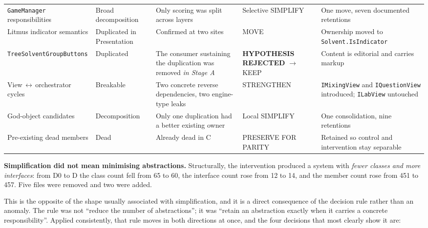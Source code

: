 \documentclass{sbc2019}%
\begin{document}
\begin{table}[!tp]
\begin{tabular}{p{}p{}p{}p{}p{}}
\addlinespace
\texttt{GameManager} responsibilities & Broad decomposition & Only scoring was split across layers & Selective SIMPLIFY & One move, seven documented retentions \\
\addlinespace
Litmus indicator semantics & Duplicated in Presentation & Confirmed at two sites & MOVE & Ownership moved to \texttt{Solvent.\allowbreak{}IsIndicator} \\
\addlinespace
\texttt{TreeSolvent\allowbreak{}GroupButtons} & Duplicated & The consumer sustaining the duplication was removed \emph{in Stage A} & \textbf{HYPOTHESIS REJECTED} $\rightarrow$ KEEP & Content is editorial and carries markup \\
\addlinespace
View\,$\leftrightarrow$\,orchestrator cycles & Breakable & Two concrete reverse dependencies, two engine-type leaks & STRENGTHEN & \texttt{IMixingView} and \texttt{IQuestionView} introduced; \texttt{ILabView} untouched \\
\addlinespace
God-object candidates & Decomposition & Only one duplication had a better existing owner & Local SIMPLIFY & One consolidation, nine retentions \\
\addlinespace
Pre-existing dead members & Dead & Already dead in C & PRESERVE FOR PARITY & Retained so control and intervention stay separable \\
\bottomrule
\end{tabular}
\end{table}

\medskip\noindent\textbf{Simplification did not mean minimising abstractions.}
Structurally, the intervention produced a system with \emph{fewer classes and
more interfaces}: from D0 to D the class count fell from 65 to 60, the interface
count rose from 12 to 14, and the member count rose from 451 to 457. Five files
were removed and two were added.

This is the opposite of the shape usually associated with simplification, and it
is a direct consequence of the decision rule rather than an anomaly. The rule was
not ``reduce the number of abstractions''; it was ``retain an abstraction exactly
when it carries a concrete responsibility''. Applied consistently, that rule
moves in both directions at once, and the four decisions that most clearly show
it are:
\end{document}
